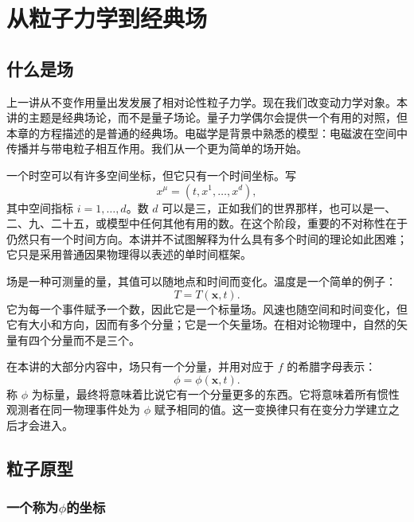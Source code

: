 \chapter{从粒子力学到经典场}

\section{什么是场}

上一讲从不变作用量出发发展了相对论性粒子力学。现在我们改变动力学对象。本讲的主题是经典场论，而不是量子场论。量子力学偶尔会提供一个有用的对照，但本章的方程描述的是普通的经典场。电磁学是背景中熟悉的模型：电磁波在空间中传播并与带电粒子相互作用。我们从一个更为简单的场开始。

一个时空可以有许多空间坐标，但它只有一个时间坐标。写
\begin{equation}
x^\mu=(t,x^1,\ldots,x^d),
\end{equation}
其中空间指标 \(i=1,\ldots,d\)。数 \(d\) 可以是三，正如我们的世界那样，也可以是一、二、九、二十五，或模型中任何其他有用的数。在这个阶段，重要的不对称性在于仍然只有一个时间方向。本讲并不试图解释为什么具有多个时间的理论如此困难；它只是采用普通因果物理得以表述的单时间框架。

场是一种可测量的量，其值可以随地点和时间而变化。温度是一个简单的例子：
\begin{equation}
T=T(\mathbf{x},t).
\end{equation}
它为每一个事件赋予一个数，因此它是一个标量场。风速也随空间和时间变化，但它有大小和方向，因而有多个分量；它是一个矢量场。在相对论物理中，自然的矢量有四个分量而不是三个。

在本讲的大部分内容中，场只有一个分量，并用对应于 \(f\) 的希腊字母表示：
\begin{equation}
\phi=\phi(\mathbf{x},t).
\label{eq:sr4-field-definition}
\end{equation}
称 \(\phi\) 为标量，最终将意味着比说它有一个分量更多的东西。它将意味着所有惯性观测者在同一物理事件处为 \(\phi\) 赋予相同的值。这一变换律只有在变分力学建立之后才会进入。

\section{粒子原型}

\subsection{一个称为\texorpdfstring{\(\phi\)}{phi}的坐标}

